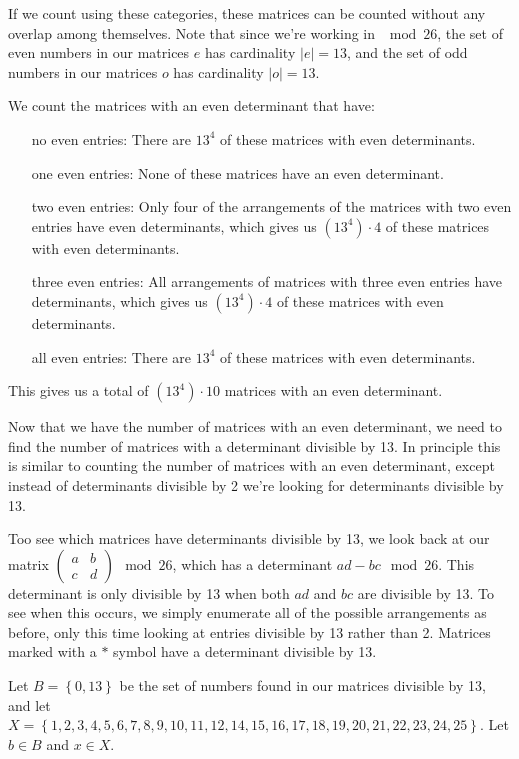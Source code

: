 \documentclass[12pt]{article}
\begin{document}
If we count using these categories, these matrices can be counted without any overlap among themselves. Note that since we're working in $\mod 26$, the set of even numbers in our matrices $e$ has cardinality $\left|e\right| = 13$, and the set of odd numbers in our matrices $o$ has cardinality $\left|o\right| = 13$.

\pagebreak
We count the matrices with an even determinant that have:
\begin{itemize}
\item[no even entries:] There are $13^4$ of these matrices with even determinants.
\item[one even entries:] None of these matrices have an even determinant.
\item[two even entries:] Only four of the arrangements of the matrices with two even entries have even determinants, which gives us $\left(13^4\right) \cdot 4$ of these matrices with even determinants.
\item[three even entries:] All arrangements of matrices with three even entries have determinants, which gives us $\left(13^4\right) \cdot 4$ of these matrices with even determinants.
\item[all even entries:] There are $13^4$ of these matrices with even determinants.
\end{itemize}

This gives us a total of $\left(13^4\right) \cdot 10$ matrices with an even determinant.

Now that we have the number of matrices with an even determinant, we need to find the number of matrices with a determinant divisible by 13. In principle this is similar to counting the number of matrices with an even determinant, except instead of determinants divisible by 2 we're looking for determinants divisible by 13.

Too see which matrices have determinants divisible by 13, we look back at our matrix $\left(\begin{matrix} a & b \\ c & d\end{matrix}\right) \mod 26$, which has a determinant $ad - bc \mod 26$. This determinant is only divisible by 13 when both $ad$ and $bc$ are divisible by 13. To see when this occurs, we simply enumerate all of the possible arrangements as before, only this time looking at entries divisible by 13 rather than 2. Matrices marked with a $*$ symbol have a determinant divisible by 13.

Let $B = \left\{0, 13\right\}$ be the set of numbers found in our matrices divisible by 13, and let $X = \left\{1, 2, 3, 4, 5, 6, 7, 8, 9, 10, 11, 12, 14, 15, 16, 17, 18, 19, 20, 21, 22, 23, 24, 25\right\}$. Let $b \in B$ and $x \in X$.
\end{document}
